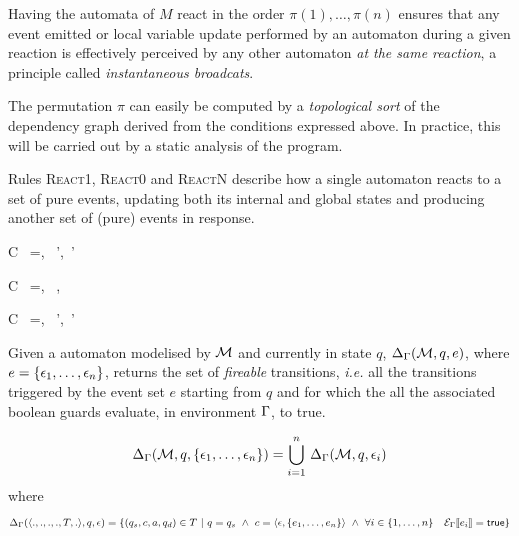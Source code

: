 Having the automata of $M$ react in the order $\pi(1),\ldots,\pi(n)$ ensures that any event emitted or local
variable update performed by an automaton during a given reaction is effectively perceived by any
other automaton \emph{at the same reaction}, a principle called \emph{instantaneous broadcats}.

The permutation $\pi$ can easily be computed by a \emph{topological sort} of the dependency graph
derived from the conditions expressed above. In practice, this will be carried out by a static
analysis of the program. 

\step Rules \textsc{React1}, \textsc{React0} and \textsc{ReactN} describe how a single automaton reacts to a
set of pure events, updating both its internal and global states and producing another set of (pure)
events in response.

\begin{multicols}{2}
{C \vdash\ \mu=,\ \env {} \mu',\ \env'}

{C \vdash\ \mu=,\ \env {} \mu,\ \env}
\end{multicols}

{C \vdash\ \mu=,\ \env {} \mu',\ \env'}

Given a automaton modelised by $\mathcal{M}$ and currently in state $q$, $\Delta_\Gamma(\mathcal{M},q,e)$, where
$e=\{\epsilon_1,\ldots,\epsilon_n\}$, returns
the set of \emph{fireable} transitions, \emph{i.e.} all the transitions triggered by the event set
$e$ starting from $q$ and for which the all the associated boolean guards evaluate, in environment $\Gamma$, to
\textsf{true}.

\begin{equation*}
  \Delta_\Gamma(\mathcal{M},q,\{\epsilon_1,\ldots,\epsilon_n\}) = \displaystyle{\bigcup_{i=1}^{n}}~\Delta_\Gamma(\mathcal{M},q,\epsilon_i)
\end{equation*}
where
\begin{equation*}
 \Delta_\Gamma(\langle., ., ., ., T, .\rangle,q,\epsilon) = \{ (q_s,c,a,q_d) \in T ~|~
  q=q_s ~\wedge~ c = \langle\epsilon, \{e_1,\ldots,e_n\}\rangle ~\wedge~ \forall i\in\{1,\ldots,n\}\quad \mathcal{E}_{\Gamma}\llbracket e_i \rrbracket = \mathsf{true} \}
\end{equation*}


